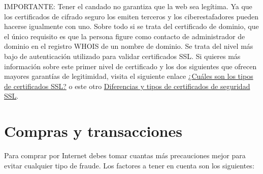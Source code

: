 \documentclass[
  a4paper,
  openany]{book}
\begin{document}
IMPORTANTE: Tener el candado no garantiza que la web sea legítima. Ya que los certificados de cifrado seguro los emiten terceros y los ciberestafadores pueden hacerse igualmente con uno. Sobre todo si se trata del certificado de dominio, que el único requisito es que la persona figure como contacto de administrador de dominio en el registro WHOIS de un nombre de dominio. Se trata del nivel más bajo de autenticación utilizado para validar certificados SSL. Si quieres más información sobre este primer nivel de certificado y los dos siguientes que ofrecen mayores garantías de legitimidad, visita el siguiente enlace
\href{https://www.globalsign.com/es/centro-de-informacion-ssl/tipos-de-certificados-ssl}{¿Cuáles son los tipos de certificados SSL?} o este otro \href{https://www.softrending.com/blog/tipos-diferencias-certificado-seguridad-ssl}{Diferencias y tipos de certificados de seguridad SSL}.

\hypertarget{compras-y-transacciones}{%
\section{Compras y transacciones}\label{compras-y-transacciones}}

Para comprar por Internet debes tomar cuantas más precauciones mejor para evitar cualquier tipo de fraude. Los factores a tener en cuenta son los siguientes:
\end{document}
